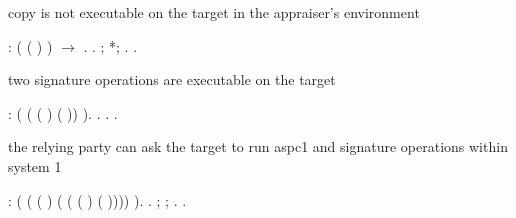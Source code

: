 \documentclass[12pt]{report}
\begin{document}
copy is not executable on the target in the appraiser's environment 
\begin{coqdoccode}
\coqdocemptyline
\coqdocnoindent
{} : ( ( )  ) \ensuremath{\rightarrow} .\coqdoceol
\coqdocnoindent
{}.\coqdoceol
\coqdocindent{1.00em}
 ;   *;  .\coqdoceol
\coqdocnoindent
{}.\coqdoceol
\coqdocemptyline
\end{coqdoccode}
two signature operations are executable on the target
\begin{coqdoccode}
\coqdocemptyline
\coqdocnoindent
{} : ( ( ( ) ( ))  ).\coqdoceol
\coqdocnoindent
{}. . .\coqdoceol
\coqdocemptyline
\end{coqdoccode}
the relying party can ask the target to run aspc1 and signature operations within system 1 
\begin{coqdoccode}
\coqdocemptyline
\coqdocnoindent
{} : ( ( ( )\coqdoceol
\coqdocindent{14.00em}
( \coqdoceol
\coqdocindent{16.00em}
( ( )\coqdoceol
\coqdocindent{16.00em}
( ))))\coqdoceol
\coqdocindent{8.00em}
 ).\coqdoceol
\coqdocnoindent
{}.\coqdoceol
\coqdocindent{1.00em}
; ; .\coqdoceol
\coqdocnoindent
{}.\coqdoceol
\coqdocemptyline
\end{coqdoccode}
\end{document}
